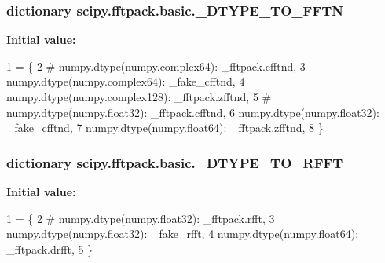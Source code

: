 \subsubsection[{\+\_\+\+D\+T\+Y\+P\+E\+\_\+\+T\+O\+\_\+\+F\+F\+T\+N}]{\setlength{\rightskip}{0pt plus 5cm}dictionary scipy.\+fftpack.\+basic.\+\_\+\+D\+T\+Y\+P\+E\+\_\+\+T\+O\+\_\+\+F\+F\+T\+N}\label{namespacescipy_1_1fftpack_1_1basic_a22c987ab3659bd6992f8c4211cd9a56d}
{\bfseries Initial value\+:}
\begin{DoxyCode}
1 = \{
2 \textcolor{comment}{#        numpy.dtype(numpy.complex64): \_fftpack.cfftnd,}
3         numpy.dtype(numpy.complex64): \_fake\_cfftnd,
4         numpy.dtype(numpy.complex128): \_fftpack.zfftnd,
5 \textcolor{comment}{#        numpy.dtype(numpy.float32): \_fftpack.cfftnd,}
6         numpy.dtype(numpy.float32): \_fake\_cfftnd,
7         numpy.dtype(numpy.float64): \_fftpack.zfftnd,
8 \}
\end{DoxyCode}
\hypertarget{namespacescipy_1_1fftpack_1_1basic_a9c405479e51eb69603548966d7985cb6}{}
\subsubsection[{\+\_\+\+D\+T\+Y\+P\+E\+\_\+\+T\+O\+\_\+\+R\+F\+F\+T}]{\setlength{\rightskip}{0pt plus 5cm}dictionary scipy.\+fftpack.\+basic.\+\_\+\+D\+T\+Y\+P\+E\+\_\+\+T\+O\+\_\+\+R\+F\+F\+T}\label{namespacescipy_1_1fftpack_1_1basic_a9c405479e51eb69603548966d7985cb6}
{\bfseries Initial value\+:}
\begin{DoxyCode}
1 = \{
2 \textcolor{comment}{#        numpy.dtype(numpy.float32): \_fftpack.rfft,}
3         numpy.dtype(numpy.float32): \_fake\_rfft,
4         numpy.dtype(numpy.float64): \_fftpack.drfft,
5 \}
\end{DoxyCode}
